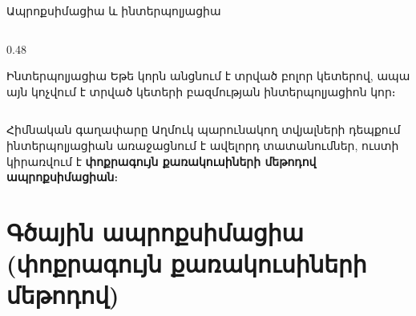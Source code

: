 \documentclass[aspectratio=169,11pt]{beamer}
\begin{document}
\begin{frame}{Ապրոքսիմացիա և ինտերպոլյացիա}
\begin{columns}[T]
        \begin{column}{0.48\textwidth}
            \begin{block}{Ինտերպոլյացիա}
                Եթե կորն անցնում է տրված բոլոր կետերով, ապա այն կոչվում է տրված կետերի բազմության ինտերպոլյացիոն կոր։
            \end{block}
            \centering
        \end{column}
    \end{columns}

    \begin{alertblock}{Հիմնական գաղափարը}
        Աղմուկ պարունակող տվյալների դեպքում ինտերպոլյացիան առաջացնում է ավելորդ տատանումներ, ուստի կիրառվում է \textbf{փոքրագույն քառակուսիների մեթոդով ապրոքսիմացիան}։
    \end{alertblock}
\end{frame}

\section{Գծային ապրոքսիմացիա (փոքրագույն քառակուսիների մեթոդով)}
\end{document}
